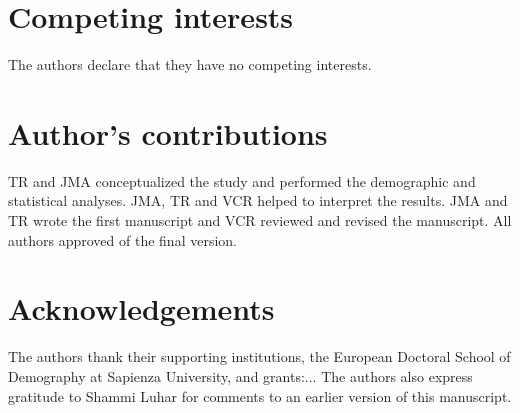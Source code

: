 \documentclass{bmcart}
\begin{document}
\begin{backmatter}

\section*{Competing interests}
  The authors declare that they have no competing interests.

\section*{Author's contributions}
TR and JMA conceptualized the study and performed the demographic and statistical analyses. JMA, TR and VCR helped to interpret the results. JMA and TR wrote the first manuscript and VCR reviewed and revised the manuscript. All authors approved of the final version.
 
\section*{Acknowledgements}
The authors thank their supporting institutions, the European Doctoral School of Demography at Sapienza University, and grants:... The authors also express gratitude to Shammi Luhar for comments to an earlier version of this manuscript.



\end{backmatter}
\end{document}
